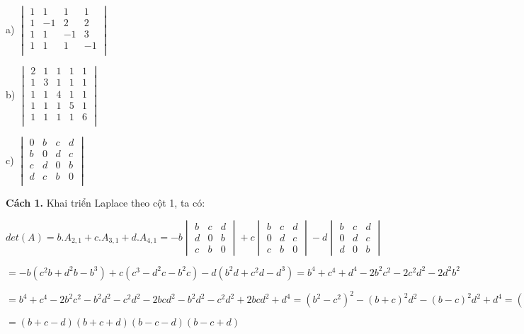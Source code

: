 \documentclass[12pt]{report}
\begin{document}
a) $\begin{vmatrix}
	1 & 1 & 1 & 1 \\
	1 & -1 & 2 & 2 \\
	1 & 1 & -1 & 3 \\
	1 & 1 & 1 & -1 \\
\end{vmatrix}$

b) $\begin{vmatrix}
	2 & 1 & 1 & 1 & 1 \\
	1 & 3 & 1 & 1 & 1 \\
	1 & 1 & 4 & 1 & 1 \\
	1 & 1 & 1 & 5 & 1 \\
	1 & 1 & 1 & 1 & 6 \\
\end{vmatrix}$

c) $\begin{vmatrix}
0 & b & c & d \\
b & 0 & d & c \\
c & d & 0 & b \\
d & c & b & 0 \\
\end{vmatrix}$

\textbf{Cách 1.} Khai triển Laplace theo cột 1, ta có:

$det(A) = b.A_{2,1} + c.A_{3,1} + d.A_{4,1} = -b\begin{vmatrix}
b & c & d \\
d & 0 & b \\
c & b & 0
\end{vmatrix} + c\begin{vmatrix}
b & c & d \\
0 & d & c \\
c & b & 0
\end{vmatrix} - d\begin{vmatrix}
b & c & d \\
0 & d & c \\
d & 0 & b
\end{vmatrix}$

$= -b\left(c^2b+d^2b-b^3\right) + c\left(c^3-d^2c-b^2c\right) -d\left(b^2d+c^2d-d^3\right) = b^4+c^4+d^4-2b^2c^2-2c^2d^2-2d^2b^2$	

$= b^4+c^4-2b^2c^2-b^2d^2-c^2d^2-2bcd^2-b^2d^2-c^2d^2+2bcd^2+d^4 = \left(b^2-c^2\right)^2-\left(b+c\right)^2d^2-\left(b-c\right)^2d^2+d^4 = \left(b^2-c^2\right)^2d^2 - \left(b^2+c^2\right)^2d^2 - (b-c)^2d^2+d^4 = \lbrack (b+c)^2-d^2 \rbrack \lbrack (b-c)^2-d^2 \rbrack$

$= (b+c-d)(b+c+d)(b-c-d)(b-c+d)$
\end{document}

